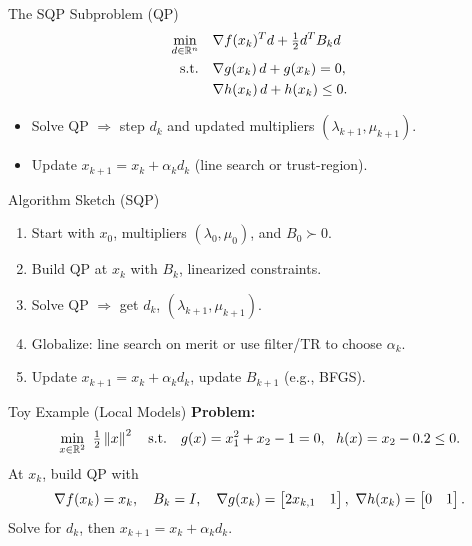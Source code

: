 \begin{frame}{The SQP Subproblem (QP)}
\[
\begin{aligned}
\min_{d \in \mathbb{R}^n}\quad & \nabla f(x_k)^T d + \tfrac{1}{2} d^T B_k d \\
\text{s.t.}\quad & \nabla g(x_k)\, d + g(x_k) = 0, \\
& \nabla h(x_k)\, d + h(x_k) \le 0.
\end{aligned}
\]
\begin{itemize}
  \item Solve QP \(\Rightarrow\) step \(d_k\) and updated multipliers \((\lambda_{k+1},\mu_{k+1})\).
  \item Update \(x_{k+1} = x_k + \alpha_k d_k\) (line search or trust-region).
\end{itemize}
\end{frame}

\begin{frame}{Algorithm Sketch (SQP)}
\begin{enumerate}
  \item Start with \(x_0\), multipliers \((\lambda_0,\mu_0)\), and \(B_0 \succ 0\).
  \item Build QP at \(x_k\) with \(B_k\), linearized constraints.
  \item Solve QP \(\Rightarrow\) get \(d_k\), \((\lambda_{k+1},\mu_{k+1})\).
  \item Globalize: line search on merit or use filter/TR to choose \(\alpha_k\).
  \item Update \(x_{k+1} = x_k + \alpha_k d_k\), update \(B_{k+1}\) (e.g., BFGS).
\end{enumerate}
\end{frame}

\begin{frame}{Toy Example (Local Models)}
\textbf{Problem:}
\[
\min_{x\in\mathbb{R}^2} \ \tfrac{1}{2}\left\lVert x \right\rVert^2
\quad \text{s.t.} \quad g(x)=x_1^2 + x_2 - 1 = 0,\ \ h(x)=x_2 - 0.2 \le 0.
\]
At \(x_k\), build QP with
\[
\grad f(x_k)=x_k,\quad B_k=I,\quad
\nabla g(x_k) = \begin{bmatrix} 2x_{k,1} & 1 \end{bmatrix},\ 
\nabla h(x_k) = \begin{bmatrix} 0 & 1 \end{bmatrix}.
\]
Solve for \(d_k\), then \(x_{k+1}=x_k+\alpha_k d_k\).
\end{frame}
 

